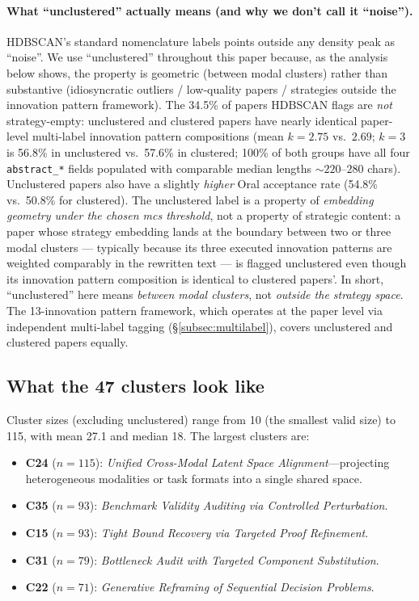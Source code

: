 \documentclass[10pt,a4paper]{article}
\begin{document}
\paragraph{What ``unclustered'' actually means (and why we don't call it ``noise'').} HDBSCAN's standard nomenclature labels points outside any density peak as ``noise''. We use ``unclustered'' throughout this paper because, as the analysis below shows, the property is geometric (between modal clusters) rather than substantive (idiosyncratic outliers / low-quality papers / strategies outside the innovation pattern framework). The 34.5\% of papers HDBSCAN flags are \emph{not} strategy-empty: unclustered and clustered papers have nearly identical paper-level multi-label innovation pattern compositions (mean $k = 2.75$ vs.\ $2.69$; $k{=}3$ is 56.8\% in unclustered vs.\ 57.6\% in clustered; 100\% of both groups have all four \texttt{abstract\_*} fields populated with comparable median lengths $\sim 220$--$280$ chars). Unclustered papers also have a slightly \emph{higher} Oral acceptance rate (54.8\% vs.\ 50.8\% for clustered). The unclustered label is a property of \emph{embedding geometry under the chosen mcs threshold}, not a property of strategic content: a paper whose strategy embedding lands at the boundary between two or three modal clusters --- typically because its three executed innovation patterns are weighted comparably in the rewritten text --- is flagged unclustered even though its innovation pattern composition is identical to clustered papers'. In short, ``unclustered'' here means \emph{between modal clusters}, not \emph{outside the strategy space}. The 13-innovation pattern framework, which operates at the paper level via independent multi-label tagging (\S\ref{subsec:multilabel}), covers unclustered and clustered papers equally.

\subsection{What the 47 clusters look like}

Cluster sizes (excluding unclustered) range from 10 (the smallest valid size) to 115, with mean 27.1 and median 18. The largest clusters are:

\begin{itemize}[nosep, leftmargin=1.5em]
\item \textbf{C24} (\(n{=}115\)): \emph{Unified Cross-Modal Latent Space Alignment}---projecting heterogeneous modalities or task formats into a single shared space.
\item \textbf{C35} (\(n{=}93\)): \emph{Benchmark Validity Auditing via Controlled Perturbation}.
\item \textbf{C15} (\(n{=}93\)): \emph{Tight Bound Recovery via Targeted Proof Refinement}.
\item \textbf{C31} (\(n{=}79\)): \emph{Bottleneck Audit with Targeted Component Substitution}.
\item \textbf{C22} (\(n{=}71\)): \emph{Generative Reframing of Sequential Decision Problems}.
\end{itemize}
\end{document}
